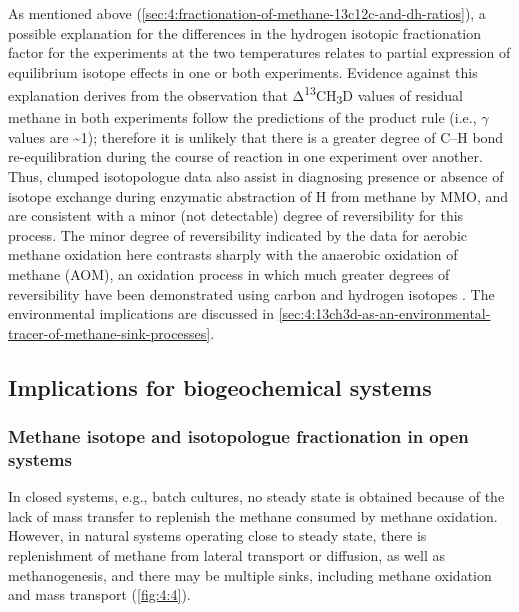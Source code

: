 As mentioned above (\autoref{sec:4:fractionation-of-methane-13c12c-and-dh-ratios}), a possible explanation for the
differences in the hydrogen isotopic fractionation factor for the
experiments at the two temperatures relates to partial expression of
equilibrium isotope effects in one or both experiments. Evidence against
this explanation derives from the observation that
Δ\textsuperscript{13}CH\textsubscript{3}D values of residual methane in
both experiments follow the predictions of the product rule (i.e., $\gamma$
values are \textasciitilde{}1); therefore it is unlikely that there is a
greater degree of C--H bond re-equilibration during the course of
reaction in one experiment over another. Thus, clumped isotopologue data
also assist in diagnosing presence or absence of isotope exchange during
enzymatic abstraction of H from methane by MMO, and are consistent with
a minor (not detectable) degree of reversibility for this process. The
minor degree of reversibility indicated by the data for aerobic methane
oxidation here contrasts sharply with the anaerobic oxidation of methane
(AOM), an oxidation process in which much greater degrees of
reversibility have been demonstrated using carbon and hydrogen isotopes
\parencite{Holler++_2011_PNAS,Yoshinaga++_2014_NG}. The environmental
implications are discussed in \autoref{sec:4:13ch3d-as-an-environmental-tracer-of-methane-sink-processes}.

\subsection{Implications for biogeochemical systems
}\label{sec:4:implications-for-biogeochemical-systems}

\subsubsection{Methane isotope and isotopologue fractionation in open
	systems}\label{sec:4:methane-isotope-and-isotopologue-fractionation-in-open-systems}



In closed systems, e.g., batch cultures, no steady state is obtained
because of the lack of mass transfer to replenish the methane consumed
by methane oxidation. However, in natural systems operating close to
steady state, there is replenishment of methane from lateral transport
or diffusion, as well as methanogenesis, and there may be multiple
sinks, including methane oxidation and mass transport (\autoref{fig:4:4}).

